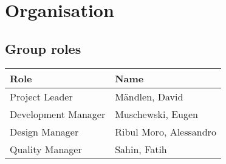 \chapter{Organisation}
\section{Group roles}
\begin{table}[h]
	\begin{tabularx}{\textwidth}{XX}
		Role & Name \\
		\toprule
		Project Leader & Mändlen, David\\
		Development Manager & Muschewski, Eugen\\
		Design Manager & Ribul Moro, Alessandro\\
		Quality Manager & Sahin, Fatih
	\end{tabularx}
\end{table}
